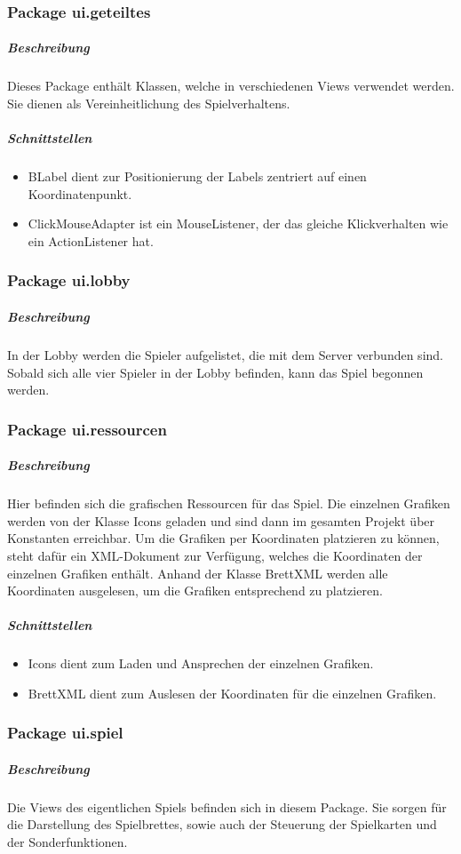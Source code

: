 \documentclass[12pt,halfparskip]{scrartcl}
\begin{document}
\clearpage
\subsubsection{Package ui.geteiltes}
\label{ssub:package_ui_geteiltes}
\subparagraph{Beschreibung}
Dieses Package enthält Klassen, welche in verschiedenen Views verwendet werden. Sie dienen als Vereinheitlichung des Spielverhaltens.

\subparagraph{Schnittstellen}
\begin{itemize}
	\item BLabel dient zur Positionierung der Labels zentriert auf einen Koordinatenpunkt.
	\item ClickMouseAdapter ist ein MouseListener, der das gleiche Klickverhalten wie ein ActionListener hat.
\end{itemize}

\subsubsection{Package ui.lobby}
\label{ssub:package_ui_lobby}
\subparagraph{Beschreibung}
In der Lobby werden die Spieler aufgelistet, die mit dem Server verbunden sind. Sobald sich alle vier Spieler in der Lobby befinden, kann das Spiel begonnen werden.

\subsubsection{Package ui.ressourcen}
\label{ssub:package_ui_ressourcen}
\subparagraph{Beschreibung}
Hier befinden sich die grafischen Ressourcen für das Spiel. Die einzelnen Grafiken werden von der Klasse Icons geladen und sind dann im gesamten Projekt über Konstanten erreichbar. Um die Grafiken per Koordinaten platzieren zu können, steht dafür ein XML-Dokument zur Verfügung, welches die Koordinaten der einzelnen Grafiken enthält. Anhand der Klasse BrettXML werden alle Koordinaten ausgelesen, um die Grafiken entsprechend zu platzieren.

\subparagraph{Schnittstellen}
\begin{itemize}
	\item Icons dient zum Laden und Ansprechen der einzelnen Grafiken.
	\item BrettXML dient zum Auslesen der Koordinaten für die einzelnen Grafiken.
\end{itemize}

\subsubsection{Package ui.spiel}
\label{ssub:package_ui_spiel}
\subparagraph{Beschreibung}
Die Views des eigentlichen Spiels befinden sich in diesem Package. Sie sorgen für die Darstellung des Spielbrettes, sowie auch der Steuerung der Spielkarten und der Sonderfunktionen.
\end{document}
